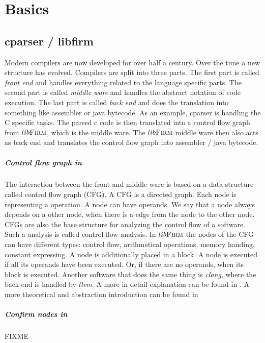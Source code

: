 \chapter{Basics}\label{sec:basics}

\section{cparser / libfirm}
Modern compilers are now developed for over half a century. Over the time a new structure has evolved. Compilers are split into three parts. The first part is called \textit{front end} and handles everything related to the language specific parts. The second part is called \textit{middle ware} and handles the abstract notation of code execution. The last part is called \textit{back end} and does the translation into something like assembler or java bytecode. As an example, cparser is handling the C specific tasks. The parsed c code is then translated into a control flow graph from $lib\textsc{Firm}$, which is the middle ware. The $lib\textsc{Firm}$ middle ware then also acts as back end and translates the control flow graph into assembler / java bytecode.

\paragraph{Control flow graph in \libFIRM} The interaction between the front and middle ware is based on a data structure called control flow graph (CFG). A CFG is a directed graph. Each node is representing a operation. A node can have operands. We say that a node always depends on a other node, when there is a edge from the node to the other node. CFGs are also the base structure for analyzing the control flow of a software. Such a analysis is called control flow analysis. In $lib\textsc{Firm}$ the nodes of the CFG can have different types: control flow, arithmetical operations, memory handing, constant expressing. A node is additionally placed in a block. A node is executed if all its operands have been executed. Or, if there are no operands, when its block is executed.
Another software that does the same thing is \textit{clang}, where the back end is handled by \textit{llvm}.
A more in detail explanation can be found in \cite{libfirm}. A more theoretical and abstraction introduction can be found in \cite{control-flow-analysis}

\paragraph{Confirm nodes in \libFIRM} FIXME

